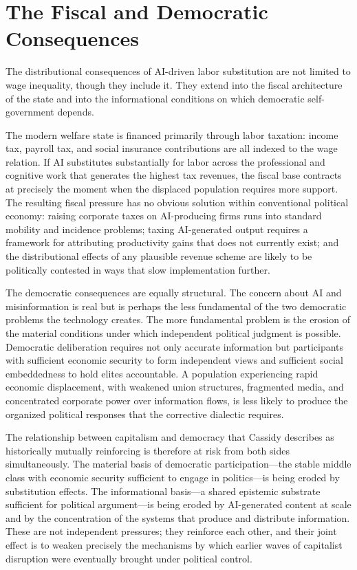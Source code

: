 \documentclass[11pt, a4paper]{article}
\theoremstyle{plain}
\theoremstyle{definition}
\begin{document}
\section{The Fiscal and Democratic Consequences}

The distributional consequences of AI-driven labor substitution are not limited
to wage inequality, though they include it. They extend into the fiscal
architecture of the state and into the informational conditions on which
democratic self-government depends.

The modern welfare state is financed primarily through labor taxation: income
tax, payroll tax, and social insurance contributions are all indexed to the
wage relation. If AI substitutes substantially for labor across the
professional and cognitive work that generates the highest tax revenues, the
fiscal base contracts at precisely the moment when the displaced population
requires more support. The resulting fiscal pressure has no obvious solution
within conventional political economy: raising corporate taxes on AI-producing
firms runs into standard mobility and incidence problems; taxing AI-generated
output requires a framework for attributing productivity gains that does not
currently exist; and the distributional effects of any plausible revenue scheme
are likely to be politically contested in ways that slow implementation further.

The democratic consequences are equally structural. The concern about AI and
misinformation is real but is perhaps the less fundamental of the two
democratic problems the technology creates. The more fundamental problem is
the erosion of the material conditions under which independent political
judgment is possible. Democratic deliberation requires not only accurate
information but participants with sufficient economic security to form
independent views and sufficient social embeddedness to hold elites
accountable. A population experiencing rapid economic displacement, with
weakened union structures, fragmented media, and concentrated corporate power
over information flows, is less likely to produce the organized political
responses that the corrective dialectic requires.

The relationship between capitalism and democracy that Cassidy describes as
historically mutually reinforcing is therefore at risk from both sides
simultaneously. The material basis of democratic participation---the stable
middle class with economic security sufficient to engage in politics---is
being eroded by substitution effects. The informational basis---a shared
epistemic substrate sufficient for political argument---is being eroded by
AI-generated content at scale and by the concentration of the systems that
produce and distribute information. These are not independent pressures; they
reinforce each other, and their joint effect is to weaken precisely the
mechanisms by which earlier waves of capitalist disruption were eventually
brought under political control.
\end{document}
